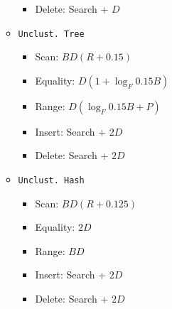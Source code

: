 \documentclass[landscape,8pt]{extarticle}
\newcommand{\code}{\lstinline}
\begin{document}
\begin{multicols}{5}
\begin{itemize}
\begin{itemize}
\begin{itemize}
                            \item Delete: Search + $D$
                        \end{itemize}
                  \item \code{Unclust. Tree}
                        \begin{itemize}
                            \item Scan: $BD(R+0.15)$
                            \item Equality: $D(1 + \log_F 0.15 B)$
                            \item Range: $D(\log_F 0.15B + P)$
                            \item Insert: Search + $2D$
                            \item Delete: Search + $2D$
                        \end{itemize}
                  \item \code{Unclust. Hash}
                        \begin{itemize}
                            \item Scan: $BD(R+0.125)$
                            \item Equality: $2D$
                            \item Range: $BD$
                            \item Insert: Search + $2D$
                            \item Delete: Search + $2D$
                        \end{itemize}
              \end{itemize}
    \end{itemize}
\end{multicols}
\end{document}
